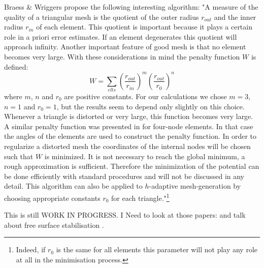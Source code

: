 Braess \& Wriggers \cite{brwr00} propose the following interesting algorithm:
"A measure of the quality of a triangular mesh is the quotient of the
outer radius $r_{out}$ and the inner radius $r_{in}$ 
of each element. This quotient is important because it plays a
certain role in a priori error estimates. If an element degenerates this quotient will approach infinity.
Another important feature of good mesh is that no element becomes very large. With these considerations
in mind the penalty function $W$ is defined:
\begin{equation}
W = \sum_{elts} \left( \frac{r_{out}}{r_{in}} \right)^m \left( \frac{r_{out}}{r_0} \right)^n
\end{equation}
where $m$, $n$ and $r_0$ are positive constants. 
For our calculations we chose $m=3$, $n=1$ and $r_0=1$, but the results seem
to depend only slightly on this choice. Whenever a triangle is distorted or very large, this function becomes
very large. A similar penalty function was presented in \cite{jole97} for 
four-node elements. In that case the angles
of the elements are used to construct the penalty function.
In order to regularize a distorted mesh the coordinates of the internal nodes will be chosen such that $W$ is
minimized. It is not necessary to reach the global minimum, a rough approximation is sufficient.
Therefore the minimization of the potential can be done efficiently with standard procedures and will not be
discussed in any detail. This algorithm can also be applied to $h$-adaptive mesh-generation by choosing
appropriate constants $r_0$ for each triangle."\footnote{Indeed, if $r_0$ is the same for all elements
this parameter will not play any role at all in the minimisation process.} 


\vspace{4cm}
This is still WORK IN PROGRESS. I Need to look at those papers:
\cite{huli88}\cite{pobe98}
\cite{bens89}
\cite{dumg11}
\cite{dumy16} 
\cite{anmp15}
\cite{krwd12}
\cite{stcl10}
\cite{maie12}
\cite{guez96}\cite{zhgm96}
\cite{elsp04}
\cite{brwr00}
and talk about free surface stabilisation \cite{kamm10,qube11,dumg11,robh17}.



